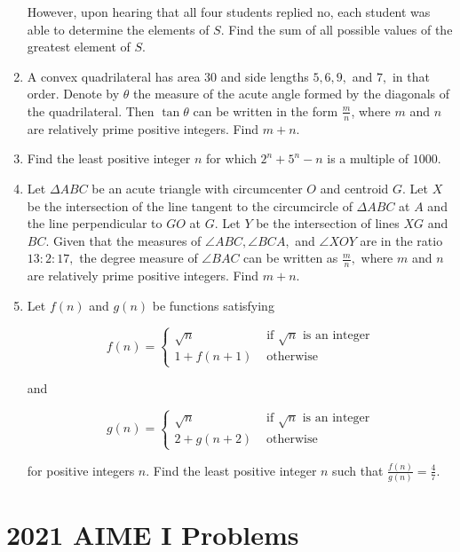 \documentclass{article}
\begin{document}
\begin{enumerate}[label=\arabic*., itemsep=0.5em]
However, upon hearing that all four students replied no, each student was able to determine the elements of \(S\). Find the sum of all possible values of the greatest element of \(S\).\par \vspace{0.5em}\item A convex quadrilateral has area \(30\) and side lengths \(5, 6, 9,\) and \(7,\) in that order. Denote by \(\theta\) the measure of the acute angle formed by the diagonals of the quadrilateral. Then \(\tan \theta\) can be written in the form \(\tfrac{m}{n}\), where \(m\) and \(n\) are relatively prime positive integers. Find \(m + n\).\par \vspace{0.5em}\item Find the least positive integer \(n\) for which \(2^n + 5^n - n\) is a multiple of \(1000\).\par \vspace{0.5em}\item Let \(\Delta ABC\) be an acute triangle with circumcenter \(O\) and centroid \(G\). Let \(X\) be the intersection of the line tangent to the circumcircle of \(\Delta ABC\) at \(A\) and the line perpendicular to \(GO\) at \(G\). Let \(Y\) be the intersection of lines \(XG\) and \(BC\). Given that the measures of \(\angle ABC, \angle BCA, \) and \(\angle XOY\) are in the ratio \(13 : 2 : 17, \) the degree measure of \(\angle BAC\) can be written as \(\frac{m}{n},\) where \(m\) and \(n\) are relatively prime positive integers. Find \(m+n\).\par \vspace{0.5em}\item Let \(f(n)\) and \(g(n)\) be functions satisfying

\begin{equation*}
f(n) = 
\begin{cases}
\sqrt{n} & \text{ if } \sqrt{n} \text{ is an integer}\\
1 + f(n+1) & \text{ otherwise}
\end{cases}
\end{equation*}

and

\begin{equation*}
g(n) = \begin{cases}\sqrt{n} & \text{ if } \sqrt{n} \text{ is an integer}\\
2 + g(n+2) & \text{ otherwise}
\end{cases}
\end{equation*}

for positive integers \(n\). Find the least positive integer \(n\) such that \(\tfrac{f(n)}{g(n)} = \tfrac{4}{7}\).\par \vspace{0.5em}
\end{enumerate}
\newpage\section*{2021 AIME I Problems}
\end{document}

